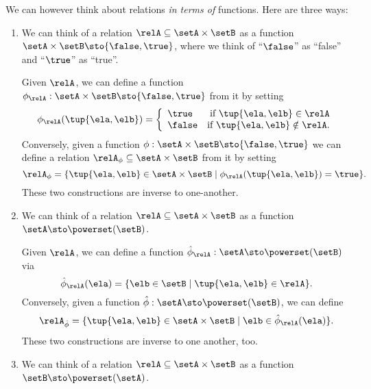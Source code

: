 \begin{remark}\label{re:rel-three-fun-descriptions}
We can however think about relations \emph{in terms of} functions. Here are three ways: 
\begin{enumerate}
\item We can think of a relation $\relA \subseteq \setA \times \setB$ as a function $\setA \times \setB \sto \{ \false, \true \}$, where we think of ``$\false$'' as ``false'' and ``$\true$'' as ``true''. 

Given $\relA$, we can define a function $\phi_{\relA} : \setA \times \setB \sto \{ \false, \true \}$ from it by setting 
\begin{equation}
\phi_{\relA}(\tup{\ela, \elb}) = 
\left 
\{\begin{array}{lr}
        \true & \text{if } \tup{\ela, \elb} \in \relA \\
        \false & \text{if } \tup{\ela, \elb} \notin \relA.
        \end{array}
\right. 
\end{equation}
Conversely, given a function $\phi: \setA \times \setB \sto \{ \false, \true \}$ we can define a relation $\relA_{\phi} \subseteq \setA \times \setB$ from it by setting 
\begin{equation}
\relA_{\phi} = \{ \tup{\ela, \elb} \in \setA \times \setB \mid \phi_{\relA}(\tup{\ela, \elb}) = \true \}.
\end{equation}
These two constructions are inverse to one-another. 

\item We can think of a relation $\relA \subseteq \setA \times \setB$ as a function $\setA  \sto \powerset (\setB)$. 

Given $\relA$, we can define a function $\hat \phi_{\relA} : \setA \sto \powerset (\setB)$ via 
\begin{equation}
\hat \phi_{\relA} (\ela) = \{ \elb \in \setB \mid \tup{\ela, \elb} \in \relA \}. 
\end{equation}
Conversely, given a function $\hat \phi : \setA \sto \powerset (\setB)$, we can define 
\begin{equation}
\relA_{\hat \phi} = \{ \tup{\ela, \elb} \in \setA \times \setB \mid \elb \in \hat \phi_{\relA}(\ela)   \}.
\end{equation}
These two constructions are inverse to one another, too. 

\item We can think of a relation $\relA \subseteq \setA \times \setB$ as a function $\setB  \sto \powerset (\setA)$. 


\end{enumerate}
\end{remark}
